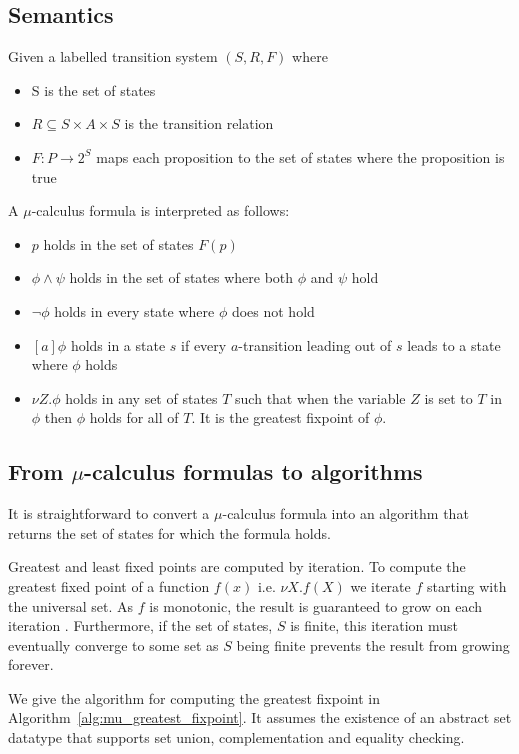 \subsection{Semantics}

Given a labelled transition system $(S, R, F)$ where
\begin{itemize}
    \item S is the set of states
    \item $R \subseteq S \times A \times S$ is the transition relation
    \item $F : P \rightarrow 2^S$ maps each proposition to the set of states where the proposition is true
\end{itemize}

\noindent A $\mu$-calculus formula is interpreted as follows:
\begin{itemize}
    \item $p$ holds in the set of states $F(p)$
    \item $\phi \wedge \psi$ holds in the set of states where both $\phi$ and $\psi$ hold
    \item $\neg \phi$ holds in every state where $\phi$ does not hold 
    \item $[a]\phi$ holds in a state $s$ if every $a$-transition leading out of $s$ leads to a state where $\phi$ holds
    \item $\nu Z. \phi$ holds in any set of states $T$ such that when the variable $Z$ is set to $T$ in $\phi$ then $\phi$ holds for all of $T$. It is the greatest fixpoint of $\phi$.
\end{itemize}

\subsection{From $\mu$-calculus formulas to algorithms}

It is straightforward to convert a $\mu$-calculus formula into an algorithm that returns the set of states for which the formula holds.

Greatest and least fixed points are computed by iteration. To compute the greatest fixed point of a function $f(x)$ i.e. $\nu X. f(X)$ we iterate $f$ starting with the universal set. As $f$ is monotonic, the result is guaranteed to grow on each iteration . Furthermore, if the set of states, $S$ is finite, this iteration must eventually converge to some set as $S$ being finite prevents the result from growing forever. 

We give the algorithm for computing the greatest fixpoint in Algorithm~\ref{alg:mu_greatest_fixpoint}. It assumes the existence of an abstract set datatype that supports set union, complementation and equality checking.

